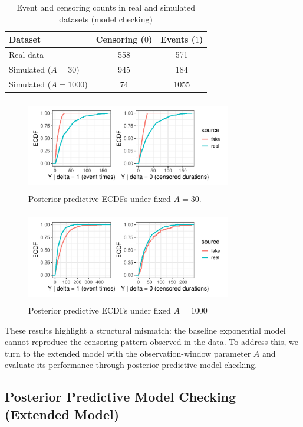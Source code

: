 \begin{table}[H]
\centering
\caption{{\small Event and censoring counts in real and simulated datasets (model checking)}}
\label{tab:modelcheck_counts}
\small  
\begin{tabular}{lcc}
\toprule
\textbf{Dataset} & \textbf{Censoring ($0$)} & \textbf{Events ($1$)} \\
\midrule
Real data        & 558  & 571  \\
Simulated ($A=30$)   & 945  & 184  \\
Simulated ($A=1000$) & 74   & 1055 \\
\bottomrule
\end{tabular}
\end{table}

\begin{figure}[H]
    \centering
    \includegraphics[height=4cm, width=0.8\textwidth]{images/ppc_two_a30.pdf}
    \caption{{\small Posterior predictive ECDFs under fixed $A=30$.}}
    \label{fig:ppc_a30}
\end{figure}

\begin{figure}[H]
    \centering
    \includegraphics[height=4cm, width=0.8\textwidth]{images/ppc_two_a1000.pdf}
    \caption{{\small Posterior predictive ECDFs under fixed $A=1000$}}
    \label{fig:ppc_a1000}
\end{figure}
These results highlight a structural mismatch: the baseline exponential model cannot reproduce the censoring pattern observed in the data. To address this, we turn to the extended model with the observation-window parameter $A$ and evaluate its performance through posterior predictive model checking.


\subsection{Posterior Predictive Model Checking (Extended Model)}